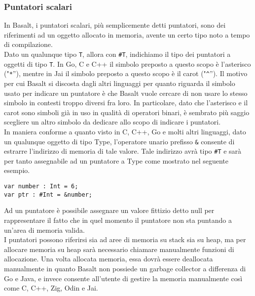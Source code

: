 \subsubsection{Puntatori scalari}
In Basalt, i puntatori scalari, più semplicemente detti puntatori, sono dei riferimenti ad un oggetto allocato in memoria, 
avente un certo tipo noto a tempo di compilazione. \\

Dato un qualunque tipo \texttt{T}, allora con \texttt{\#T}, indichiamo il tipo dei puntatori a oggetti di tipo \texttt{T}. In Go, C e C++ il simbolo preposto a 
questo scopo è l’asterisco ("\texttt{*}”), mentre in Jai il simbolo preposto a questo scopo è il carot ("\texttt{\^}”). Il motivo per cui 
Basalt si discosta dagli altri linguaggi per quanto riguarda il simbolo usato per indicare un puntatore è che Basalt vuole cercare di non usare lo stesso 
simbolo in contesti troppo diversi fra loro. In particolare, dato che l’asterisco e il carot sono simboli già in uso in qualità di operatori binari, 
è sembrato più saggio scegliere un altro simbolo da dedicare allo scopo di indicare i puntatori. \\  

In maniera conforme a quanto visto in C, C++, Go e molti altri linguaggi, dato un qualunque oggetto di tipo Type, l’operatore unario prefisso \texttt{\&} 
consente di estrarre l’indirizzo di memoria di tale valore. Tale indirizzo avrà tipo \texttt{\#T} e sarà per tanto assegnabile ad un puntatore 
a Type come mostrato nel seguente esempio. \\

\vspace{0.5cm}
\begin{lstlisting}[frame=single]
var number : Int = 6;
var ptr : #Int = &number;
\end{lstlisting}
\vspace{0.5cm}

Ad un puntatore è possibile assegnare un valore fittizio detto null per rappresentare il fatto che in quel momento il puntatore non sta puntando a 
un’area di memoria valida. \\

I puntatori possono riferirsi sia ad aree di memoria su stack sia su heap, ma per allocare memoria su 
heap sarà necessario chiamare manualmente funzioni di allocazione. Una volta allocata memoria, essa dovrà essere 
deallocata manualmente in quanto Basalt non possiede un garbage collector a differenza di Go e Java, e invece consente 
all’utente di gestire la memoria manualmente così come C, C++, Zig, Odin e Jai. \\

